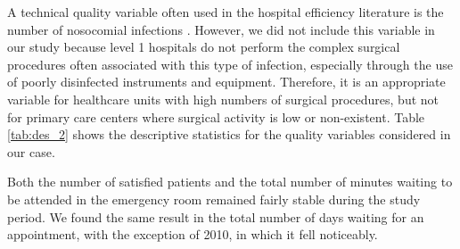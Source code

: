 \documentclass[11pt,a4paper,oneside]{article}
\begin{document}

A technical quality variable often used in the hospital efficiency literature is the number of nosocomial infections \citep{Prior2001}. However, we did not include this variable in our study because level 1 hospitals do not perform the complex surgical procedures often associated with this type of infection, especially through the use of poorly disinfected instruments and equipment. Therefore, it is an appropriate variable for healthcare units with high numbers of surgical procedures, but not for primary care centers where surgical activity is low or non-existent. Table \ref{tab:des_2} shows the descriptive statistics for the quality variables considered in our case.




Both the number of satisfied patients and the total number of minutes waiting to be attended in the emergency room remained fairly stable during the study period. We found the same result in the total number of days waiting for an appointment, with the exception of 2010, in which it fell noticeably.
\end{document}

